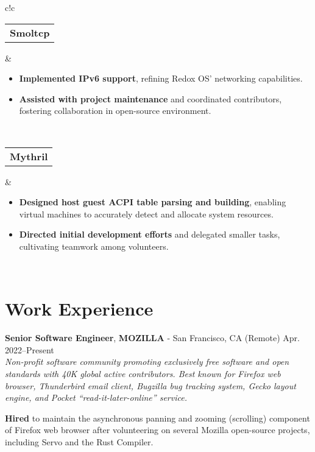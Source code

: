 \documentclass[a4paper,skipsamekey,11pt,english]{curve}
\newcommand{\makeWorkHistoryTitle}[5]{
  \begin{tcolorbox}[colback=base1!10,colframe=base1!10,frame hidden]
    {\color{blue}\textbf{#1}}, \textbf{#2} - #3 \hfill #4\\
    {\small\textit{#5}}
  \end{tcolorbox}
}
\begin{document}
\begin{center}
{\begin{tabular}{c!{\color{blue}\vrule}c}
      \hline
      {
       \begin{tabular}{c}
         \color{base03}\textbf{Smoltcp}
       \end{tabular}
      } & {
        \begin{minipage}{5in}
          \vspace{5pt}
          \begin{itemize}
            \item \textbf{Implemented IPv6 support}, refining Redox OS’
            networking capabilities.
            \item \textbf{Assisted with project maintenance} and coordinated
            contributors, fostering collaboration in open-source environment.
          \end{itemize}
        \end{minipage}
        \vspace{1pt}
      }
      \\
      \hline
      {
       \begin{tabular}{c}
         \color{base03}\textbf{Mythril}
       \end{tabular}
      } & {
        \begin{minipage}{5in}
          \vspace{5pt}
          \begin{itemize}
            \item \textbf{Designed host guest ACPI table parsing and building},
            enabling virtual machines to accurately detect and allocate system
            resources.
            \item \textbf{Directed initial development efforts} and delegated
            smaller tasks, cultivating teamwork among volunteers.
          \end{itemize}
        \end{minipage}
        \vspace{1pt}
      }
      \\
    \end{tabular}}
  \end{center}

  \section{Work Experience}
  \makeWorkHistoryTitle
    {Senior Software Engineer}
    {MOZILLA}
    {San Francisco, CA (Remote)}
    {Apr. 2022–Present}
    {
      Non-profit software community promoting exclusively free software and open
      standards with 40K global active contributors. Best known for Firefox web
      browser, Thunderbird email client, Bugzilla bug tracking system, Gecko
      layout engine, and Pocket “read-it-later-online” service.
    }
  \textbf{Hired} to maintain the asynchronous panning and zooming (scrolling)
  component of Firefox web browser after volunteering on several Mozilla
  open-source projects, including Servo and the Rust Compiler.
\end{document}
